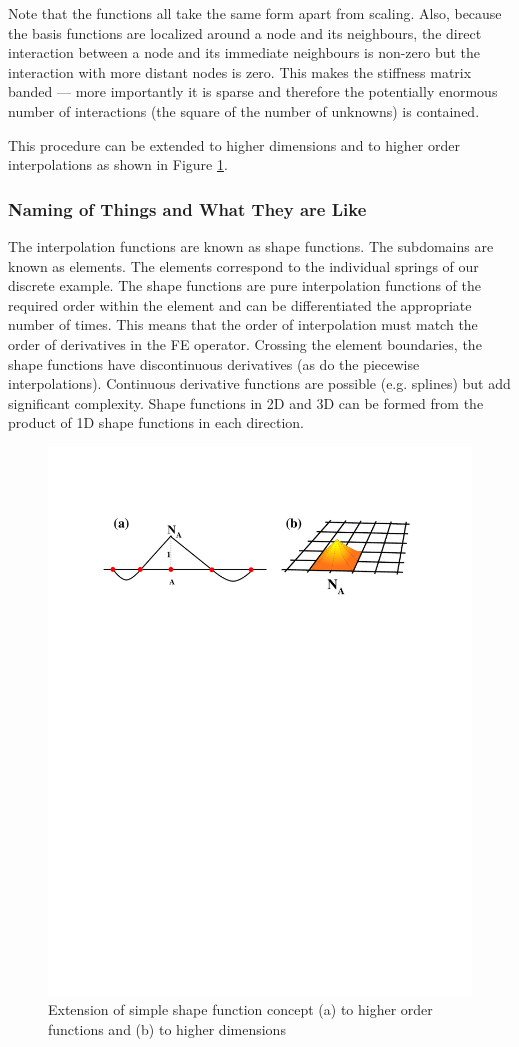 \documentclass[10pt]{article}
\begin{document}
		 Note that the functions all take the 
		same form apart from scaling. Also, because the
		basis functions are localized around a node and its neighbours, 
		the direct interaction between a node and its immediate neighbours
		is non-zero but the interaction with more distant nodes is zero. This
		makes the stiffness matrix banded --- more importantly it is 
		sparse and therefore the potentially enormous number of interactions
		(the square of the number of unknowns) is contained.
		
		This procedure can be extended to higher dimensions and to 
		higher order interpolations as shown in Figure \ref{fig:sfn1}. 
		
		\subsubsection{Naming of Things and What They are Like}
		
		The interpolation functions are
		known as shape functions. 
		The subdomains are known as elements.
		The elements correspond to the individual springs of our
		discrete example.
		The shape functions are pure interpolation
		functions of the required order within the element and
		can be differentiated the appropriate number of 
		times. This means that the order of interpolation
		must match the order of derivatives in the FE operator.
		Crossing the element boundaries, the
		shape functions have discontinuous derivatives (as do the
		piecewise interpolations). Continuous derivative functions are
		possible (e.g. splines) but add significant complexity.
			Shape functions in 2D and 3D can be formed from the 
		product of 1D shape functions in each direction.
	
			\begin{figure}[h]           
				\begin{center}
		 			 \includegraphics[width=0.66\linewidth]{Diagrams/shapefn.pdf}
		 			\caption[]{Extension of simple shape function concept (a) to 
		 			higher order functions and  (b) to higher dimensions}
		 			\label{fig:sfn1}
		 		\end{center}
			\end{figure}	
	
\end{document}
